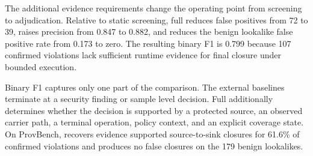 The additional evidence requirements change the operating point from screening
to adjudication. Relative to static screening, full \system reduces false
positives from 72 to 39, raises precision from 0.847 to 0.882, and reduces the
benign lookalike false positive rate from 0.173 to zero. The resulting binary
F1 is 0.799 because 107 confirmed violations lack sufficient runtime evidence
for final closure under bounded execution.

Binary F1 captures only one part of the comparison. The external
baselines terminate at a security finding or sample level decision. Full
\system additionally determines whether the decision is supported by a
protected source, an observed carrier path, a terminal operation, policy
context, and an explicit coverage state. On ProvBench, \system recovers
evidence supported source-to-sink closures for 61.6\% of confirmed violations
and produces no false closures on the 179 benign lookalikes.